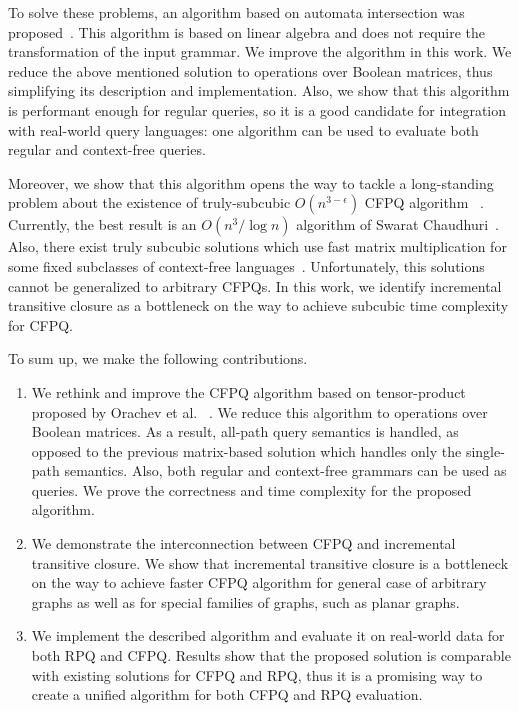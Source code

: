 To solve these problems, an algorithm based on automata intersection was proposed~\cite{10.1007/978-3-030-54832-2_6}.
This algorithm is based on linear algebra and does not require the transformation of the input grammar.
We improve the algorithm in this work.
We reduce the above mentioned solution to operations over Boolean matrices, thus simplifying its description and implementation.
Also, we show that this algorithm is performant enough for regular queries, so it is a good candidate for integration with real-world query languages: one algorithm can be used to evaluate both regular and context-free queries.

Moreover, we show that this algorithm opens the way to tackle a long-standing problem about the existence of truly-subcubic $O(n^{3-\epsilon})$ CFPQ algorithm ~\cite{10.1145/1328438.1328460, Yannakakis}.
Currently, the best result is an $O(n^3/\log{n})$ algorithm of Swarat Chaudhuri~\cite{10.1145/1328438.1328460}.
Also, there exist truly subcubic solutions which use fast matrix multiplication for some fixed subclasses of context-free languages~\cite{8249039}.
Unfortunately, this solutions cannot be generalized to arbitrary CFPQs.
In this work, we identify incremental transitive closure as a bottleneck on the way to achieve subcubic time complexity for CFPQ.

To sum up, we make the following contributions.
\begin{enumerate}
	\item We rethink and improve the CFPQ algorithm based on tensor-product proposed by Orachev et al. ~\cite{10.1007/978-3-030-54832-2_6}.
	We reduce this algorithm to operations over Boolean matrices.
	As a result, all-path query semantics is handled, as opposed to the previous matrix-based solution which handles only the single-path semantics.
	Also, both regular and context-free grammars can be used as queries.
	We prove the correctness and time complexity for the proposed algorithm.
	\item We demonstrate the interconnection between CFPQ and incremental transitive closure.
	We show that incremental transitive closure is a bottleneck on the way to achieve faster CFPQ algorithm for general case of arbitrary graphs as well as for special families of graphs, such as planar graphs.
	\item We implement the described algorithm and evaluate it on real-world data for both RPQ and CFPQ. Results show that the proposed solution is comparable with existing solutions for CFPQ and RPQ, thus it is a promising way to create a unified algorithm for both CFPQ and RPQ evaluation.
\end{enumerate}